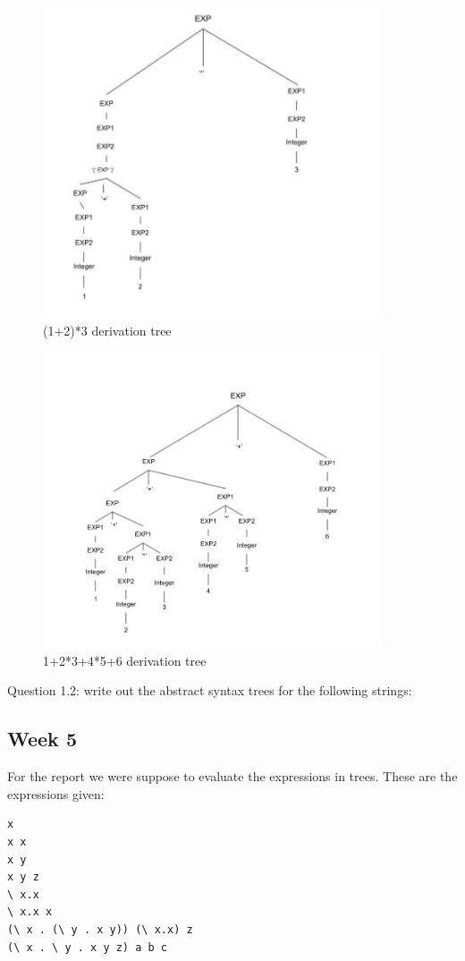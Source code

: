 \documentclass{article}
\theoremstyle{theorem}
\theoremstyle{definition}
\theoremstyle{remark}
\begin{document}
 \begin{figure}[htp]
    \centering
    \includegraphics[width=10cm]{4}
    \caption{(1+2)*3 derivation tree}
    \label{fig:(1+2)*3}
\end{figure}
 \begin{figure}[htp]
    \centering
    \includegraphics[width=10cm]{5th}
    \caption{1+2*3+4*5+6  derivation tree}
    \label{fig:1+2*3+4*5+6}
\end{figure}
Question 1.2:
    write out the abstract syntax trees for the following strings:

\subsection{Week 5}
For the report we were suppose to evaluate the expressions in trees. These are the expressions given:
\begin{lstlisting}
x
x x
x y
x y z
\ x.x
\ x.x x
(\ x . (\ y . x y)) (\ x.x) z
(\ x . \ y . x y z) a b c

\end{lstlisting}
\end{document}
